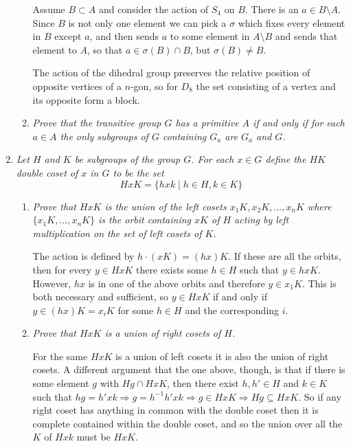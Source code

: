 \documentclass[letterpaper, 11pt]{article}
\begin{document}
\begin{enumerate}
\begin{enumerate}
Assume $B \subset A$ and consider the action of $S_4$ on $B$. There is an $a \in B \setminus A$.  Since $B$ is not only one element we can pick a $\sigma$ which fixes every element in $B$ except $a$, and then sends $a$ to some element in $A \setminus B$ and sends that element to $A$, so that $a \in \sigma(B) \cap B$, but $\sigma(B) \neq B$.

The action of the dihedral group preserves the relative position of opposite vertices of a $n$-gon, so for $D_8$ the set consisting of a vertex and its opposite form a block.

\item \emph{Prove that the transitive group $G$ has a primitive $A$ if and only if for each $a \in A$ the only subgroups of $G$ containing $G_a$ are $G_a$ and $G$.}
\end{enumerate}

\newpage

\item \emph{Let $H$ and $K$ be subgroups of the group $G$.  For each $x \in G$ define the \emph{$HK$ double coset} of $x$ in $G$ to be the set $$HxK = \{hxk \mid h \in H, k \in K\}$$}
\begin{enumerate}
\item \emph{Prove that $HxK$ is the union of the left cosets $x_1K, x_2K, \ldots, x_nK$ where $\{x_1K, \ldots, x_nK\}$ is the orbit containing $xK$ of $H$ acting by left multiplication on the set of left cosets of $K$.}

The action is defined by $h \cdot (xK) = (hx)K$.  If these are all the orbits, then for every $y \in HxK$ there exists some $h \in H$ such that $y \in hxK$.  However, $hx$ is in one of the above orbits and therefore $y \in x_1K$.  This is both necessary and sufficient, so $y \in HxK$ if and only if $y \in (hx)K = x_iK$ for some $h \in H$ and the corresponding $i$.

\item \emph{Prove that $HxK$ is a union of right cosets of $H$.}

For the same $HxK$ is a union of left cosets it is also the union of right cosets.  A different argument that the one above, though, is that if there is some element $g$ with $Hg \cap HxK$, then there exist $h, h' \in H$ and $k \in K$ such that $hg = h'xk \Rightarrow g = h^{-1}h'xk \Rightarrow g \in HxK \Rightarrow Hg \subseteq HxK$.  So if any right coset has anything in common with the double coset then it is complete contained within the double coset, and so the union over all the $K$ of $Hxk$ must be $HxK$.


\end{enumerate}
\end{enumerate}
\end{document}
